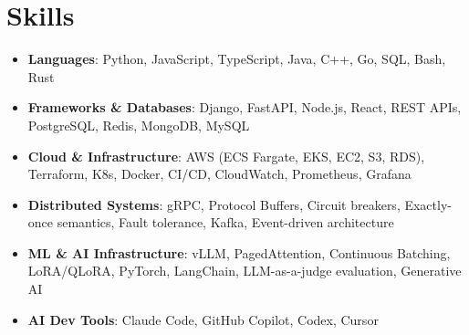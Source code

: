 \documentclass[letterpaper,11pt]{article}
\newcommand{\resumeSubHeadingListStart}{\begin{itemize}[leftmargin=0.15in, label={}]}
\newcommand{\resumeSubHeadingListEnd}{\end{itemize}}
\newcommand{\resumeSkillHeading}[2]{%
  \item\small{\textbf{#1}: #2 \vspace{-9pt}}%
}
\begin{document}
\section{Skills}
  \resumeSubHeadingListStart
    \resumeSkillHeading{Languages}{Python, JavaScript, TypeScript, Java, C++, Go, SQL, Bash, Rust}
    \resumeSkillHeading{Frameworks \& Databases}{Django, FastAPI, Node.js, React, REST APIs, PostgreSQL, Redis, MongoDB, MySQL}
    \resumeSkillHeading{Cloud \& Infrastructure}{AWS (ECS Fargate, EKS, EC2, S3, RDS), Terraform, K8s, Docker, CI/CD, CloudWatch, Prometheus, Grafana}
    \resumeSkillHeading{Distributed Systems}{gRPC, Protocol Buffers, Circuit breakers, Exactly-once semantics, Fault tolerance, Kafka, Event-driven architecture}
    \resumeSkillHeading{ML \& AI Infrastructure}{vLLM, PagedAttention, Continuous Batching, LoRA/QLoRA, PyTorch, LangChain, LLM-as-a-judge evaluation, Generative AI}
    \resumeSkillHeading{AI Dev Tools}{Claude Code, GitHub Copilot, Codex, Cursor}
  \resumeSubHeadingListEnd
\end{document}
